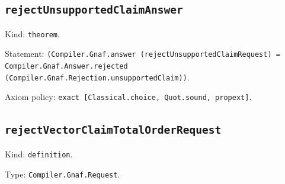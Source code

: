 \documentclass[11pt]{article}
\begin{document}
\subsection*{\texttt{rejectUnsupportedClaimAnswer}}
\noindent Kind: \texttt{theorem}.\par
\noindent Statement: \texttt{(Compiler.Gnaf.answer (rejectUnsupportedClaimRequest) = Compiler.Gnaf.Answer.rejected (Compiler.Gnaf.Rejection.unsupportedClaim))}.\par
\noindent Axiom policy: \texttt{exact [Classical.choice, Quot.sound, propext]}.\par
\subsection*{\texttt{rejectVectorClaimTotalOrderRequest}}
\noindent Kind: \texttt{definition}.\par
\noindent Type: \texttt{Compiler.Gnaf.Request}.\par
\end{document}
